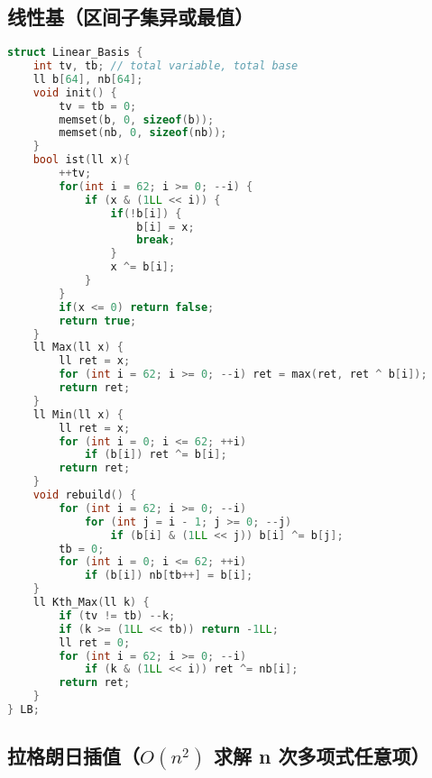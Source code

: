 \subsection{线性基（区间子集异或最值）}

\begin{lstlisting}[language=C++]
struct Linear_Basis {
    int tv, tb; // total variable, total base
    ll b[64], nb[64];
    void init() {
        tv = tb = 0;
        memset(b, 0, sizeof(b));
        memset(nb, 0, sizeof(nb));
    }
    bool ist(ll x){
        ++tv;
        for(int i = 62; i >= 0; --i) {
            if (x & (1LL << i)) {
                if(!b[i]) {
                    b[i] = x;
                    break;
                }
                x ^= b[i];
            }
        }
        if(x <= 0) return false;
        return true;
    }
    ll Max(ll x) {
        ll ret = x;
        for (int i = 62; i >= 0; --i) ret = max(ret, ret ^ b[i]);
        return ret;
    }
    ll Min(ll x) {
        ll ret = x;
        for (int i = 0; i <= 62; ++i)
            if (b[i]) ret ^= b[i];
        return ret;
    }
    void rebuild() {
        for (int i = 62; i >= 0; --i)
            for (int j = i - 1; j >= 0; --j)
                if (b[i] & (1LL << j)) b[i] ^= b[j];
        tb = 0;
        for (int i = 0; i <= 62; ++i)
            if (b[i]) nb[tb++] = b[i];
    }
    ll Kth_Max(ll k) {
        if (tv != tb) --k;
        if (k >= (1LL << tb)) return -1LL;
        ll ret = 0;
        for (int i = 62; i >= 0; --i)
            if (k & (1LL << i)) ret ^= nb[i];
        return ret;
    }
} LB;
\end{lstlisting}

\subsection{拉格朗日插值（$O(n^2)$ 求解 n 次多项式任意项）}

